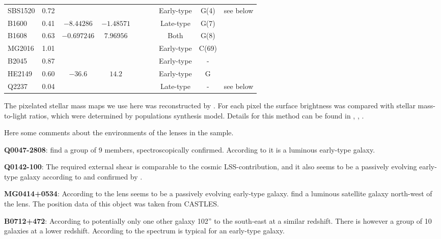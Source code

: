 \documentclass[10pt]{article}
\begin{document}
\begin{landscape}
\begin{center}
\begin{tabular}{l c c c c c c c c c}
	SBS1520 & 0.72 & & &   & & & Early-type & G(4) & see below\\
	B1600 & 0.41 & $-8.44286$ & $-1.48571$ &   & & & Late-type & G(7) & \cite{2007AJ....134..668A}\\
	B1608 & 0.63 & $-0.697246$ & $7.96956$ &   & & & Both & G(8) & \cite{2006ApJ...642...30F}\\
	MG2016 & 1.01 & & &   & & & Early-type & C(69) & \cite{2003MNRAS.344..337T}\\
	B2045 & 0.87 & & &   & & & Early-type & - & \cite{1999AJ....117..658F}\\
	HE2149 & 0.60 & $-36.6$ & $14.2$ &   & & & Early-type & G & \cite{2006ApJ...646...85W}\\
	Q2237 & 0.04 & & &   & & & Late-type & - & see below\\ 
	\hline
  \end{tabular}
 \end{center}
\end{landscape}

The pixelated stellar mass maps we use here was reconstructed by \cite{leier11phd}. For each pixel the surface brightness was compared with stellar mass-to-light ratios, which were determined by populations synthesis model. Details for this method can be found in \cite{leier11phd}, \cite{2005ApJ...623L...5F}, \cite{2008MNRAS.383..857F}.

Here some comments about the environments of the lenses in the sample.

\textbf{Q0047-2808}: \cite{2011ApJ...726...84W} find a group of 9 members, spectroscopically confirmed. According to \cite{1996MNRAS.278..139W} it is a luminous early-type galaxy.

\textbf{Q0142-100}: The required external shear is comparable to the cosmic LSS-contribution, and it also seems to be a passively evolving early-type galaxy according to \cite{2000ApJ...536..584L} and confirmed by \cite{2007A&A...465...51E}.

\textbf{MG0414+0534}: According to \cite{1999AJ....117.2034T} the lens seems to be a passively evolving early-type galaxy. \cite{1993AJ....105....1S} find a luminous satellite galaxy north-west of the lens. The position data of this object was taken from CASTLES.

\textbf{B0712+472}: According to \cite{2002AJ....123..627F} potentially only one other galaxy 102'' to the south-east at a similar redshift. There is however a group of 10 galaxies at a lower redshift. According to \cite{1998AJ....115..377F} the spectrum is typical for an early-type galaxy.
\end{document}
